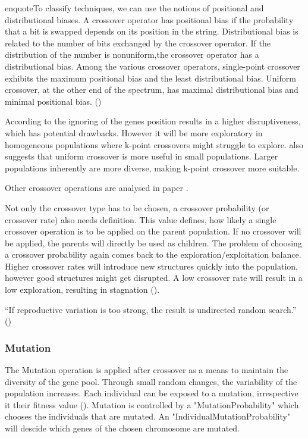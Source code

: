 enquote{To classify techniques, we can use the notions of positional and distributional biases. A crossover operator has positional bias if the probability that a bit is swapped depends on its position in the string. Distributional bias is related to the number of bits exchanged by the crossover operator. If the distribution of the number is nonuniform,the crossover operator has a distributional bias. Among the various crossover operators, single-point crossover exhibits the maximum positional bias and the least distributional bias. Uniform crossover, at the other end of the spectrum, has maximal distributional bias and minimal positional bias.} (\cite{srinivas_genetic_1994})

According to \cite{srinivas_genetic_1994} the ignoring of the genes position results in a higher disruptiveness, which has potential drawbacks. However it will be more exploratory in homogeneous populations where k-point crossovers might struggle to explore. \cite{srinivas_genetic_1994} also suggests that uniform crossover is more useful in small populations. Larger populations inherently are more diverse, making k-point crossover more suitable.

Other crossover operations are analysed in paper . 

Not only the crossover type has to be chosen, a crossover probability (or crossover rate) also needs definition. This value defines, how likely a single crossover operation is to be applied on the parent population. If no crossover will be applied, the parents will directly be used as children.
The problem of choosing a crossover probability again comes back to the exploration/exploitation balance. Higher crossover rates will introduce new structures quickly into the population, however good structures might get disrupted. A low crossover rate will result in a low exploration, resulting in stagnation (\cite{grefenstette_optimization_1986}). 

\enquote{If reproductive variation is too strong, the result is undirected random search.} (\cite{kacprzyk_parameter_2007})

\subsubsection{Mutation}
The Mutation operation is applied after crossover as a means to maintain the diversity of the gene pool. Through small random changes, the variability of the population increases. Each individual can be exposed to a mutation, irrespective it their fitness value (\cite{srinivas_genetic_1994}).
Mutation is controlled by a "MutationProbability" which chooses the individuals that are mutated. An "IndividualMutationProbability" will descide which genes of the chosen chromosome are mutated.

